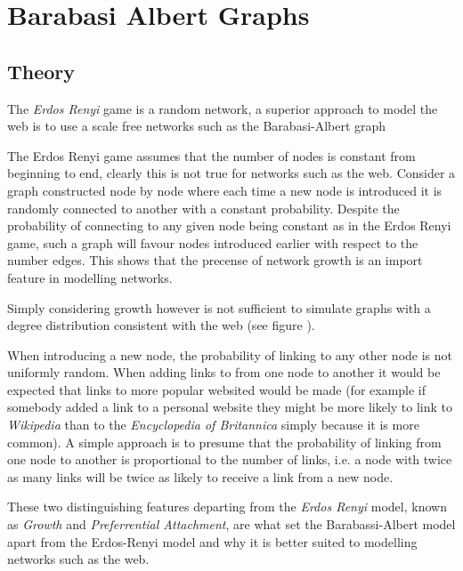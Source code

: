 \documentclass[11pt]{article}
\begin{document}
\section{Barabasi Albert Graphs}
\label{barabassi-albert}
\subsection{Theory}
\label{sec:org7c642ee}

The \emph{Erdos Renyi} game is a random network, a superior approach to model the web
is to use a scale free networks \cite{barabasiPhysicsWeb2001} such as the
Barabasi-Albert graph \cite{barabasiScalefreeCharacteristicsRandom2000}

The Erdos Renyi game assumes that the number of nodes is constant from beginning
to end, clearly this is not true for networks such as the web. Consider a graph
constructed node by node where each time a new node is introduced it is randomly
connected to another with a constant probability. Despite the probability of
connecting to any given node being constant as in the Erdos Renyi game, such a
graph will favour nodes introduced earlier with respect to the number edges.
This shows that the precense of network growth is an import feature in modelling
networks.

Simply considering growth however is not sufficient to simulate graphs with a
degree distribution consistent with the web
\cite[Ch. 7]{zengPracticalSimulationMethod2013} (see figure ).

When introducing a new node, the probability of linking to any other node is not
uniformly random. When adding links to from one node to another it would be
expected that links to more popular websited would be made (for example if
somebody added a link to a personal website they might be more likely to link to
\emph{Wikipedia} than to the \emph{Encyclopedia of Britannica} simply because it is more
common). A simple approach is to presume that the probability of linking from
one node to another is proportional to the number of links, i.e. a node with
twice as many links will be twice as likely to receive a link from a new node.

These two distinguishing features departing from the \emph{Erdos Renyi} model, known as \emph{Growth} and \emph{Preferrential Attachment}, are what set the Barabassi-Albert model apart from the Erdos-Renyi model and why it is better suited to modelling networks such as the web. \cite[Ch. 7]{barabasiLinkedNewScience2002}
\end{document}
